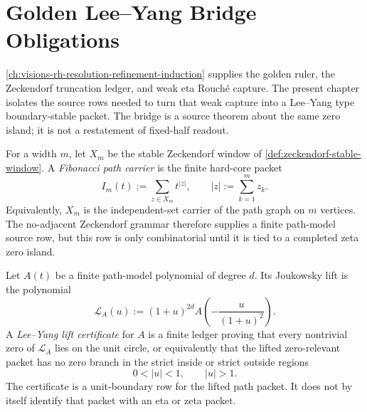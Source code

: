 \chapter{Golden Lee--Yang Bridge Obligations}
\label{ch:visions-rh-golden-lee-yang-bridge-obligations}

\autoref{ch:visions-rh-resolution-refinement-induction} supplies the
golden ruler, the Zeckendorf truncation ledger, and weak eta
Rouch\'e capture.  The present chapter isolates the source rows needed
to turn that weak capture into a Lee--Yang type boundary-stable packet.
The bridge is a source theorem about the same zero island; it is not a
restatement of fixed-half readout.

\begin{definition}
\label{def:rh-fibonacci-path-carrier}
For a width $m$, let $X_m$ be the stable Zeckendorf window of
\autoref{def:zeckendorf-stable-window}.  A \emph{Fibonacci path carrier}
is the finite hard-core packet
$$
I_m(t):=\sum_{z\in X_m} t^{|z|},
\qquad
|z|:=\sum_{k=1}^{m}z_k.
$$
Equivalently, $X_m$ is the independent-set carrier of the path graph on
$m$ vertices.  The no-adjacent Zeckendorf grammar therefore supplies a
finite path-model source row, but this row is only combinatorial until
it is tied to a completed zeta zero island.
\end{definition}

\begin{definition}
\label{def:rh-lee-yang-lift-certificate}
Let $A(t)$ be a finite path-model polynomial of degree $d$.  Its
Joukowsky lift is the polynomial
$$
\mathcal L_A(u)
:=
(1+u)^{2d}
A\left(-\frac{u}{(1+u)^2}\right).
$$
A \emph{Lee--Yang lift certificate} for $A$ is a finite ledger proving
that every nontrivial zero of $\mathcal L_A$ lies on the unit circle, or
equivalently that the lifted zero-relevant packet has no zero branch in
the strict inside or strict outside regions
$$
0<|u|<1,
\qquad
|u|>1.
$$
The certificate is a unit-boundary row for the lifted path packet.  It
does not by itself identify that packet with an eta or zeta packet.
\end{definition}

